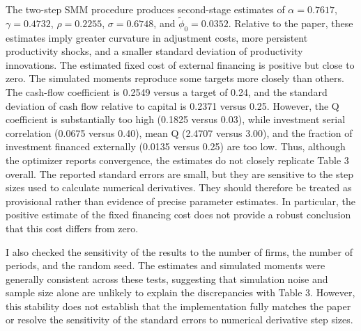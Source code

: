 \documentclass{article}
\begin{document}
The two-step SMM procedure produces second-stage estimates of $\alpha=0.7617$, $\gamma=0.4732$, $\rho=0.2255$, $\sigma=0.6748$, and $\tilde{\phi}_0=0.0352$. Relative to the paper, these estimates imply greater curvature in adjustment costs, more persistent productivity shocks, and a smaller standard deviation of productivity innovations. The estimated fixed cost of external financing is positive but close to zero.
The simulated moments reproduce some targets more closely than others. The cash-flow coefficient is 0.2549 versus a target of 0.24, and the standard deviation of cash flow relative to capital is 0.2371 versus 0.25. However, the Q coefficient is substantially too high (0.1825 versus 0.03), while investment serial correlation (0.0675 versus 0.40), mean Q (2.4707 versus 3.00), and the fraction of investment financed externally (0.0135 versus 0.25) are too low. Thus, although the optimizer reports convergence, the estimates do not closely replicate Table 3 overall.
The reported standard errors are small, but they are sensitive to the step sizes used to calculate numerical derivatives. They should therefore be treated as provisional rather than evidence of precise parameter estimates. In particular, the positive estimate of the fixed financing cost does not provide a robust conclusion that this cost differs from zero.

I also checked the sensitivity of the results to the number of firms, the number of periods, and the random seed. The estimates and simulated moments were generally consistent across these tests, suggesting that simulation noise and sample size alone are unlikely to explain the discrepancies with Table 3. However, this stability does not establish that the implementation fully matches the paper or resolve the sensitivity of the standard errors to numerical derivative step sizes.
\end{document}
